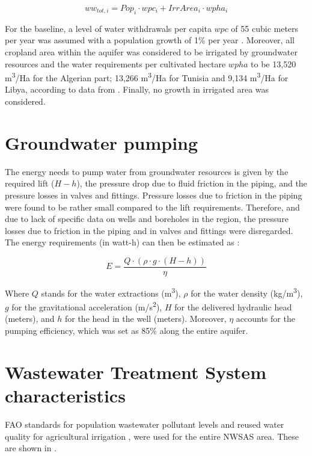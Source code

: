 \documentclass[12pt]{iopart}
\begin{document}
\begin{equation}\label{eq:waterwithdrawals} 
 ww_{tot,i} = Pop_{i}\cdot wpc_{i} +IrrArea_{i}\cdot wpha_{i} 
\end{equation}

For the baseline, a level of water withdrawals per capita $wpc$ of 55 cubic meters per year was assumed with a population growth of 1\% per year \cite{Householdwaterconsumption2014}. Moreover, all cropland area within the aquifer was considered to be irrigated by groundwater resources and the water requirements per cultivated hectare $wpha$ to be 13,520 m\textsuperscript{3}/Ha for the Algerian part; 13,266 m\textsuperscript{3}/Ha for Tunisia and 9,134 m\textsuperscript{3}/Ha for Libya, according to data from \cite{Socioeconomicaspectsirrigation2014}. Finally, no growth in irrigated area was considered.

\section{Groundwater pumping}\label{Sc:pumping}
The energy needs to pump water from groundwater resources is given by the required lift ($H-h$), the pressure drop due to fluid friction in the piping, and the pressure losses in valves and fittings. Pressure losses due to friction in the piping were found to be rather small compared to the lift requirements. Therefore, and due to lack of specific data on wells and boreholes in the region, the pressure losses due to friction in the piping and in valves and fittings were disregarded. The energy requirements (in watt-h) can then be estimated as  \cite{Groundwaterdependentirrigationcosts2017}:

\begin{equation}\label{eq:1}
E = \frac{Q\cdot(\rho\cdot g\cdot(H - h))}{\eta}
\end{equation}

Where $Q$ stands for the water extractions (m\textsuperscript{3}), $\rho$ for the water density (kg/m\textsuperscript{3}), $g$ for the gravitational acceleration (m/s\textsuperscript{2}), $H$ for the delivered hydraulic head (meters), and $h$ for the head in the well (meters). Moreover, $\eta$ accounts for the pumping efficiency, which was set as 85\% along the entire aquifer.

\section{Wastewater Treatment System characteristics}
FAO standards for population wastewater pollutant levels and reused water quality for agricultural irrigation \cite{fao1985water}, were used for the entire NWSAS area. These are shown in .
\end{document}
